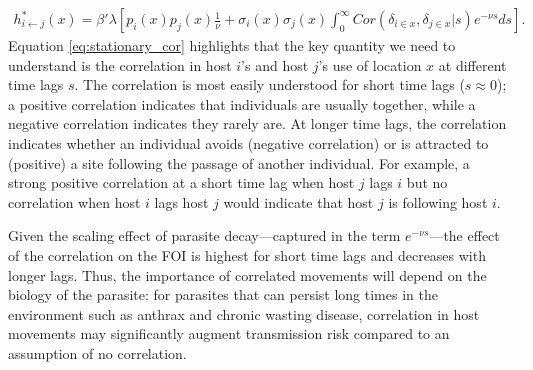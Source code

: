 \documentclass[letterpaper]{article}
\begin{document}
\begin{equation}
    \begin{aligned}
    h^*_{i \leftarrow j}(x) = \beta' \lambda \left[ p_i(x)p_j(x) \frac{1}{\nu} + \sigma_i(x) \sigma_j(x) \int_{0}^{\infty} Cor(\delta_{i \in x}, \delta_{j \in x} | s) e^{-\nu s} ds\right].
    \end{aligned}
    \label{eq:stationary_cor}
\end{equation}
Equation \ref{eq:stationary_cor} highlights that the key quantity we need to understand is the correlation in host $i$'s and host $j$'s use of location $x$ at different time lags $s$. The correlation is most easily understood for short time lags ($s\approx0$); a positive correlation indicates that individuals are usually together, while a negative correlation indicates they rarely are. At longer time lags, the correlation indicates whether an individual avoids (negative correlation) or is attracted to (positive) a site following the passage of another individual. For example, a strong positive correlation at a short time lag when host $j$ lags $i$ but no correlation when host $i$ lags host $j$ would indicate that host $j$ is following host $i$. 

Given the scaling effect of parasite decay---captured in the term $e^{-\nu s}$---the effect of the correlation on the FOI is highest for short time lags and decreases with longer lags. Thus, the importance of correlated movements will depend on the biology of the parasite: for parasites that can persist long times in the environment such as anthrax and chronic wasting disease, correlation in host movements may significantly augment transmission risk compared to an assumption of no correlation.

\end{document}
